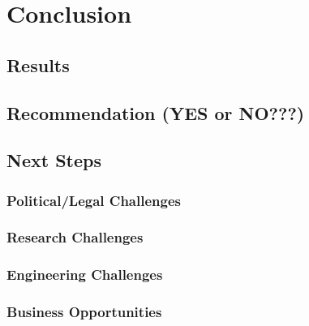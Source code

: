 \chapter{Conclusion}
\label{chapter:conclusion}

\section{Results}
\section{Recommendation (YES or NO???)}
\section{Next Steps}
\subsection{Political/Legal Challenges}
\subsection{Research Challenges}
\subsection{Engineering Challenges}
\subsection{Business Opportunities}

